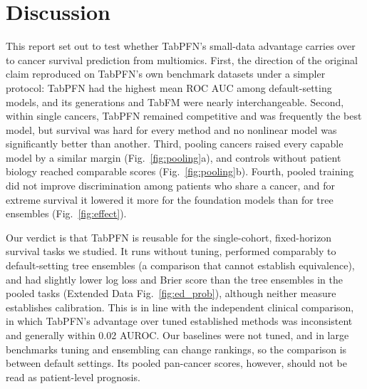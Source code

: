 \section*{Discussion}

This report set out to test whether TabPFN's small-data advantage carries over to cancer survival prediction from multiomics. First, the direction of the original claim reproduced on TabPFN's own benchmark datasets under a simpler protocol: TabPFN had the highest mean ROC AUC among default-setting models, and its generations and TabFM were nearly interchangeable. Second, within single cancers, TabPFN remained competitive and was frequently the best model, but survival was hard for every method and no nonlinear model was significantly better than another. Third, pooling cancers raised every capable model by a similar margin (Fig.~\ref{fig:pooling}a), and controls without patient biology reached comparable scores (Fig.~\ref{fig:pooling}b). Fourth, pooled training did not improve discrimination among patients who share a cancer, and for extreme survival it lowered it more for the foundation models than for tree ensembles (Fig.~\ref{fig:effect}).

Our verdict is that TabPFN is reusable for the single-cohort, fixed-horizon survival tasks we studied. It runs without tuning, performed comparably to default-setting tree ensembles (a comparison that cannot establish equivalence), and had slightly lower log loss and Brier score than the tree ensembles in the pooled tasks (Extended Data Fig.~\ref{fig:ed_prob}), although neither measure establishes calibration.\citep{van2019calibration} This is in line with the independent clinical comparison, in which TabPFN's advantage over tuned established methods was inconsistent and generally within 0.02 AUROC.\citep{shaktah2026established} Our baselines were not tuned, and in large benchmarks tuning and ensembling can change rankings,\citep{erickson2025tabarena} so the comparison is between default settings. Its pooled pan-cancer scores, however, should not be read as patient-level prognosis.

